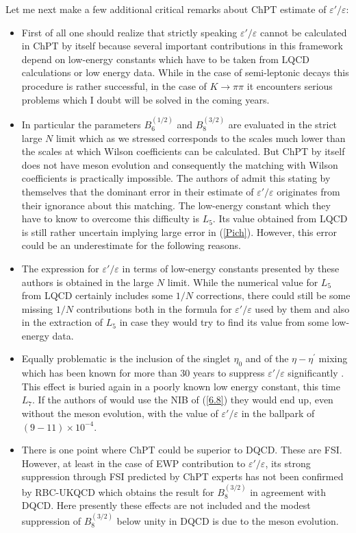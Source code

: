 \documentclass[12pt,a4paper]{article}
\newcommand{\bsi}{B_6^{(1/2)}}
\newcommand{\bei}{B_8^{(3/2)}}
\def\epe{\varepsilon'/\varepsilon}
\begin{document}
Let me next make a few  additional critical remarks about ChPT estimate of $\epe$:
\begin{itemize}
\item
  First of all one should realize that strictly speaking $\epe$ cannot be calculated in ChPT by itself because several important contributions in this framework depend on low-energy constants which have to be taken from LQCD calculations or low energy data.
  While in the case of semi-leptonic decays this procedure is rather successful,
  in the case of $K\to\pi\pi$ it encounters serious problems which I doubt will
  be solved in the coming years.
\item
  In particular the parameters $\bsi$ and $\bei$ are evaluated in the strict
  large $N$ limit which as we stressed corresponds to the scales much lower
  than the scales at which Wilson coefficients can be calculated. But ChPT
  by itself does not have meson evolution and consequently the matching
  with Wilson coefficients is practically impossible. The authors of  \cite{Cirigliano:2019ani}
  admit this stating by themselves that the dominant error in their estimate of $\epe$   originates from their ignorance about  this matching. The low-energy constant which they have to know to overcome this difficulty is $L_5$. Its value obtained from LQCD is still rather uncertain implying large error in (\ref{Pich}).
  However, this error could be an underestimate for the following reasons.
\item
  The expression for $\epe$ in terms of low-energy constants presented by these authors is obtained in the large $N$ limit. While the numerical value for $L_5$
  from LQCD certainly includes some $1/N$ corrections, there could still be  some   missing $1/N$ contributions both in the formula for $\epe$ used by them and also in the
  extraction of $L_5$ in case they would try to find its value from some low-energy data.
\item
  Equally problematic is the inclusion of the singlet $\eta_0$ and of the
  $\eta-\eta^\prime$ mixing which has been known for more than 30 years to suppress $\epe$ significantly \cite{Donoghue:1986nm,Buras:1987wc,Buras:2020pjp}.
  This effect is buried again in a poorly known low energy constant, this time  $L_7$. If the authors of  \cite{Cirigliano:2019ani} would use the NIB of (\ref{6.8}) they would end up, even without the meson evolution, with the value of $\epe$ in the ballpark of $(9-11)\times 10^{-4}$.
\item
  There is one point where ChPT could be superior to DQCD. These are FSI. However, at least in the case of EWP contribution to $\epe$, its strong suppression through FSI predicted by ChPT experts has not been confirmed by RBC-UKQCD which   obtains the result for $\bei$ in agreement with DQCD. Here presently these   effects are not included and the modest suppression of $\bei$ below
  unity in DQCD is due to the meson evolution.
  \end{itemize}
\end{document}
